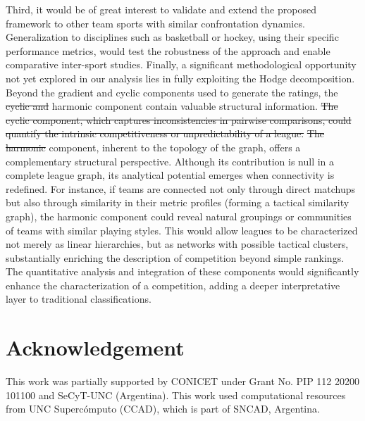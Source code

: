 \documentclass[preprint,12pt]{elsarticle}
\newcommand{\agregar}[1]{{\color{blue}{#1}}}
\newcommand{\sacar}[1]{{\color{red}\sout{#1}}}
\begin{document}
%
Third, it would be of great interest to validate and extend the proposed framework to other team sports with similar confrontation dynamics. Generalization to disciplines such as basketball or hockey, using their specific performance metrics, would test the robustness of the approach and enable comparative inter-sport studies.
%
Finally, a significant methodological opportunity not yet explored in our analysis lies in fully exploiting the Hodge decomposition. Beyond the gradient and cyclic components used to generate the ratings, the \sacar{cyclic and} harmonic component contain valuable structural information. 
%
\sacar{
The cyclic component, which captures inconsistencies in pairwise comparisons, could quantify the intrinsic competitiveness or unpredictability of a league. }
%
\sacar{The harmonic} \agregar{This} component, inherent to the topology of the graph, offers a complementary structural perspective. Although its contribution is null in a complete league graph, its analytical potential emerges when connectivity is redefined. For instance, if teams are connected not only through direct matchups but also through similarity in their metric profiles (forming a tactical similarity graph), the harmonic component could reveal natural groupings or communities of teams with similar playing styles. This would allow leagues to be characterized not merely as linear hierarchies, but as networks with possible tactical clusters, substantially enriching the description of competition beyond simple rankings.
%
The quantitative analysis and integration of these components would significantly enhance the characterization of a competition, adding a deeper interpretative layer to traditional classifications.



\section*{Acknowledgement} 
This work was partially supported by CONICET under Grant No. PIP 112 20200 101100 and SeCyT-UNC (Argentina).
This work used computational resources from UNC Supercómputo (CCAD), which is part of SNCAD, Argentina.


%
%
\end{document}
